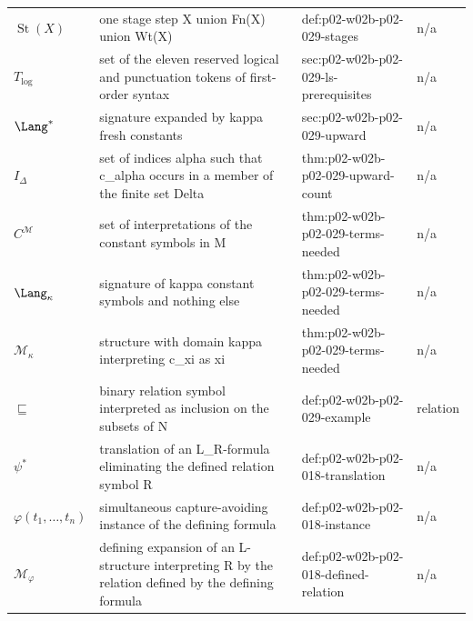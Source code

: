 \begin{longtable}{@{}p{}p{}p{}p{}@{}}
\(\operatorname{St}(X)\) & one stage step X union Fn(X) union Wt(X) & def:\allowbreak{}p02-\allowbreak{}w02b-\allowbreak{}p02-\allowbreak{}029-\allowbreak{}stages & n/a \\
\(T_{\mathrm{log}}\) & set of the eleven reserved logical and punctuation tokens of first-order syntax & sec:\allowbreak{}p02-\allowbreak{}w02b-\allowbreak{}p02-\allowbreak{}029-\allowbreak{}ls-\allowbreak{}prerequisites & n/a \\
\(\Lang^*\) & signature expanded by kappa fresh constants & sec:\allowbreak{}p02-\allowbreak{}w02b-\allowbreak{}p02-\allowbreak{}029-\allowbreak{}upward & n/a \\
\(I_\Delta\) & set of indices alpha such that c\_alpha occurs in a member of the finite set Delta & thm:\allowbreak{}p02-\allowbreak{}w02b-\allowbreak{}p02-\allowbreak{}029-\allowbreak{}upward-\allowbreak{}count & n/a \\
\(C^{\mathcal M}\) & set of interpretations of the constant symbols in M & thm:\allowbreak{}p02-\allowbreak{}w02b-\allowbreak{}p02-\allowbreak{}029-\allowbreak{}terms-\allowbreak{}needed & n/a \\
\(\Lang_\kappa\) & signature of kappa constant symbols and nothing else & thm:\allowbreak{}p02-\allowbreak{}w02b-\allowbreak{}p02-\allowbreak{}029-\allowbreak{}terms-\allowbreak{}needed & n/a \\
\(\mathcal M_\kappa\) & structure with domain kappa interpreting c\_xi as xi & thm:\allowbreak{}p02-\allowbreak{}w02b-\allowbreak{}p02-\allowbreak{}029-\allowbreak{}terms-\allowbreak{}needed & n/a \\
\(\sqsubseteq\) & binary relation symbol interpreted as inclusion on the subsets of N & def:\allowbreak{}p02-\allowbreak{}w02b-\allowbreak{}p02-\allowbreak{}029-\allowbreak{}example & relation \\
\(\psi^{*}\) & translation of an L\_R-formula eliminating the defined relation symbol R & def:\allowbreak{}p02-\allowbreak{}w02b-\allowbreak{}p02-\allowbreak{}018-\allowbreak{}translation & n/a \\
\(\varphi(t_1,\allowbreak \ldots,\allowbreak t_n)\) & simultaneous capture-avoiding instance of the defining formula & def:\allowbreak{}p02-\allowbreak{}w02b-\allowbreak{}p02-\allowbreak{}018-\allowbreak{}instance & n/a \\
\(\mathcal M_{\varphi}\) & defining expansion of an L-structure interpreting R by the relation defined by the defining formula & def:\allowbreak{}p02-\allowbreak{}w02b-\allowbreak{}p02-\allowbreak{}018-\allowbreak{}defined-\allowbreak{}relation & n/a \\

\end{longtable}
